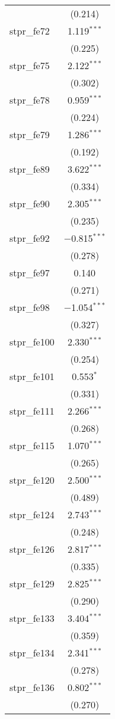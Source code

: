 \begin{table}[!htbp]
\begin{tabular}{@{\extracolsep{5pt}}lc}
  & (0.214) \\ 
  stpr\_fe72 & 1.119$^{***}$ \\ 
  & (0.225) \\ 
  stpr\_fe75 & 2.122$^{***}$ \\ 
  & (0.302) \\ 
  stpr\_fe78 & 0.959$^{***}$ \\ 
  & (0.224) \\ 
  stpr\_fe79 & 1.286$^{***}$ \\ 
  & (0.192) \\ 
  stpr\_fe89 & 3.622$^{***}$ \\ 
  & (0.334) \\ 
  stpr\_fe90 & 2.305$^{***}$ \\ 
  & (0.235) \\ 
  stpr\_fe92 & $-$0.815$^{***}$ \\ 
  & (0.278) \\ 
  stpr\_fe97 & 0.140 \\ 
  & (0.271) \\ 
  stpr\_fe98 & $-$1.054$^{***}$ \\ 
  & (0.327) \\ 
  stpr\_fe100 & 2.330$^{***}$ \\ 
  & (0.254) \\ 
  stpr\_fe101 & 0.553$^{*}$ \\ 
  & (0.331) \\ 
  stpr\_fe111 & 2.266$^{***}$ \\ 
  & (0.268) \\ 
  stpr\_fe115 & 1.070$^{***}$ \\ 
  & (0.265) \\ 
  stpr\_fe120 & 2.500$^{***}$ \\ 
  & (0.489) \\ 
  stpr\_fe124 & 2.743$^{***}$ \\ 
  & (0.248) \\ 
  stpr\_fe126 & 2.817$^{***}$ \\ 
  & (0.335) \\ 
  stpr\_fe129 & 2.825$^{***}$ \\ 
  & (0.290) \\ 
  stpr\_fe133 & 3.404$^{***}$ \\ 
  & (0.359) \\ 
  stpr\_fe134 & 2.341$^{***}$ \\ 
  & (0.278) \\ 
  stpr\_fe136 & 0.802$^{***}$ \\ 
  & (0.270) \\ 

\end{tabular}
\end{table}
